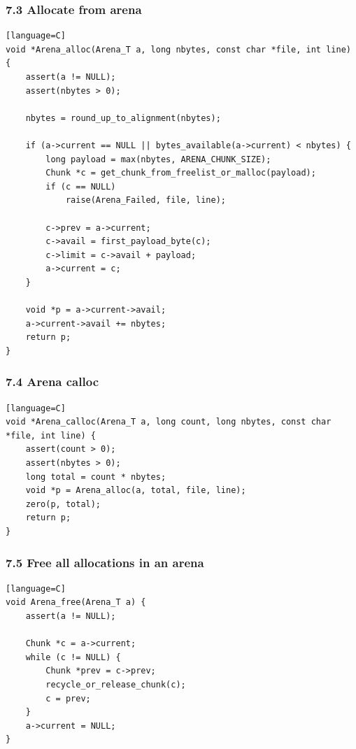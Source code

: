 \documentclass[11pt]{article}
\begin{document}
\subsubsection{7.3 Allocate from arena}\label{allocate-from-arena}

\begin{verbatim}[language=C]
void *Arena_alloc(Arena_T a, long nbytes, const char *file, int line) {
    assert(a != NULL);
    assert(nbytes > 0);

    nbytes = round_up_to_alignment(nbytes);

    if (a->current == NULL || bytes_available(a->current) < nbytes) {
        long payload = max(nbytes, ARENA_CHUNK_SIZE);
        Chunk *c = get_chunk_from_freelist_or_malloc(payload);
        if (c == NULL)
            raise(Arena_Failed, file, line);

        c->prev = a->current;
        c->avail = first_payload_byte(c);
        c->limit = c->avail + payload;
        a->current = c;
    }

    void *p = a->current->avail;
    a->current->avail += nbytes;
    return p;
}
\end{verbatim}

\subsubsection{7.4 Arena calloc}\label{arena-calloc}

\begin{verbatim}[language=C]
void *Arena_calloc(Arena_T a, long count, long nbytes, const char *file, int line) {
    assert(count > 0);
    assert(nbytes > 0);
    long total = count * nbytes;
    void *p = Arena_alloc(a, total, file, line);
    zero(p, total);
    return p;
}
\end{verbatim}

\subsubsection{7.5 Free all allocations in an arena}\label{free-all-allocations-in-an-arena}

\begin{verbatim}[language=C]
void Arena_free(Arena_T a) {
    assert(a != NULL);

    Chunk *c = a->current;
    while (c != NULL) {
        Chunk *prev = c->prev;
        recycle_or_release_chunk(c);
        c = prev;
    }
    a->current = NULL;
}
\end{verbatim}
\end{document}
